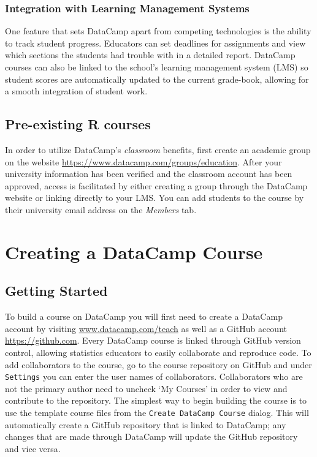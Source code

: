 \documentclass[12pt]{article}\usepackage[]{graphicx}\usepackage[]{color}
\begin{document}
\subsubsection{Integration with Learning Management Systems}
One feature that sets DataCamp apart from competing technologies is the ability to track student progress. Educators
can set deadlines for assignments and view which sections the
students had trouble with in a detailed report. DataCamp courses can also be linked to the school's learning management system (LMS) so student scores are automatically updated to the
current grade-book, allowing for a smooth integration of student work.


\subsection{Pre-existing R courses}
In order to utilize 
DataCamp's \textit{classroom} benefits, first create an academic group on the website \url{https://www.datacamp.com/groups/education}.
After your university information has been verified and the classroom account has been approved, access is facilitated 
by either creating a group through the DataCamp website or linking directly to your LMS. You can add students to the course by their university email address on the \textit{Members} tab.
\section{Creating a DataCamp Course}
\subsection{Getting Started}
To build a course on DataCamp you will first need to create a DataCamp account by visiting \url{www.datacamp.com/teach} as well as
a GitHub account \url{https://github.com}. Every DataCamp course is linked through GitHub version control,
allowing statistics educators to easily collaborate and reproduce code. To add collaborators to the course, go to the course repository
on GitHub and under \texttt{Settings} you can enter the user names of collaborators. Collaborators who are not the primary author need 
to uncheck `My Courses' in order to view and contribute to the repository. The simplest way to begin building the course is to use the template course files from the
\texttt{Create DataCamp Course} dialog. This will automatically create a GitHub repository that is linked to DataCamp; any changes that are
made through DataCamp will update the GitHub repository and vice versa. 
\end{document}
